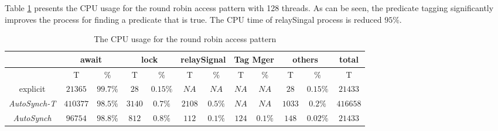 \documentclass[preprint]{sigplanconf}
\begin{document}
Table \ref{tab:cpu} presents the CPU usage for the round robin access pattern
with 128 threads. As can be seen, the predicate tagging significantly improves
the process for finding a predicate that is true. The CPU time of relaySingal 
process is reduced $95\%$.  

\begin{table}[ht!]
   \centering
   \begin{tabular}{|c||c|c||c|c||c|c||c|c|c|c|c|}
      \hline 
      & \multicolumn{2}{c||}{await} & \multicolumn{2}{c||}{lock} & 
        \multicolumn{2}{c||}{relaySignal} & \multicolumn{2}{c|}{Tag Mger} &
        \multicolumn{2}{c|}{others} & total \\
      \hline
         & T & \% & T & \% & T & \% & T & \% & T & \% & T \\
      \hline 
      \hline 
      explicit & $21365$ & $99.7\%$ & $28$ & $0.15\%$ & $NA$ & $NA$ & $NA$ &
      $NA$  & $28$ & $0.15\%$ & $21433$ \\
      \hline 
      {\em AutoSynch-T} & $410377$ & $98.5\%$ & $3140$ & $0.7\%$ & $2108$ & $0.5\%$
      & $NA$ & $NA$ & $1033$ & $0.2\%$ & $416658$\\
      \hline 
      {\em AutoSynch} & $96754$ & $98.8\%$ & $812$ & $0.8\%$ & $112$ & $0.1\%$ & 
      $124$ & $0.1\%$ & $148$ & $0.02\%$ & $21433$\\
      \hline 
   \end{tabular}
   \caption{The CPU usage for the round robin access pattern}
   \label{tab:cpu}
\end{table}
\end{document}
